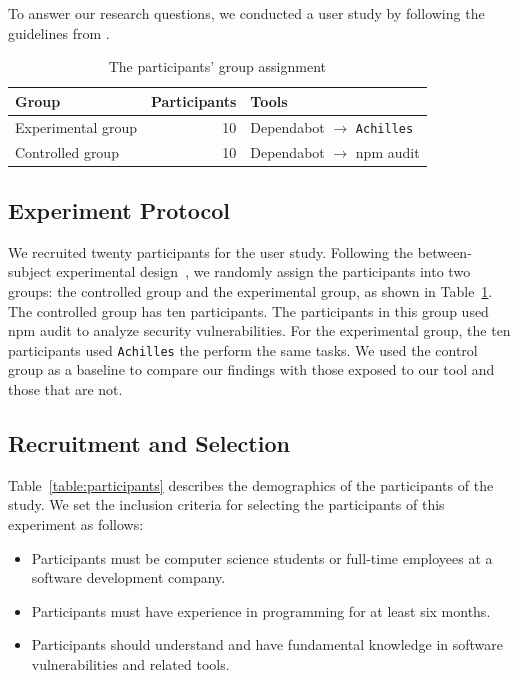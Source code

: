 \documentclass[conference]{IEEEtran}
\begin{document}
	To answer our research questions, we conducted a user study by following the guidelines from \citet{Ko2013}.
	
		\begin{table}[tb]
		\centering
		\caption{The participants' group assignment}
		\begin{tabular}{lrl}
			\toprule
			Group & Participants & Tools \\
			\midrule
			Experimental group & 10 & Dependabot $\rightarrow$ \texttt{Achilles} \\
			\midrule
			Controlled group & 10 & Dependabot $\rightarrow$ npm audit \\
			\bottomrule
		\end{tabular}
		\label{table:group_assignment}
	\end{table}
	
	\subsection{Experiment Protocol}
	We recruited twenty participants for the user study.
	Following the between-subject experimental design~\citep{Charness2012}, we randomly assign the participants into two groups: the controlled group and the experimental group, as shown in Table~\ref{table:group_assignment}. The controlled group has ten participants. The participants in this group used npm audit to analyze security vulnerabilities. For the experimental group, the ten participants used \texttt{Achilles} the perform the same tasks. 
	We used the control group as a baseline to compare our findings with those exposed to our tool and those that are not.
	
	\subsection{Recruitment and Selection}
	Table~\ref{table:participants} describes the demographics of the participants of the study.
	We set the inclusion criteria for selecting the participants of this experiment as follows:
	
	\begin{itemize}
		\item Participants must be computer science students or full-time employees at a software development company.
		\item Participants must have experience in programming for at least six months.
		\item Participants should understand and have fundamental knowledge in software vulnerabilities and related tools.
	\end{itemize}
	
\end{document}
